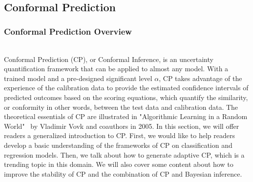 \subsection{Conformal Prediction}
\subsubsection{Conformal Prediction Overview}\hfill\\
Conformal Prediction (CP), or Conformal Inference,  is an uncertainty quantification framework that can be applied to almost any model.  With a trained model and a pre-designed significant level $\alpha$, CP takes advantage of the experience of the calibration data to provide the estimated confidence intervals of predicted outcomes based on the scoring equations, which quantify the similarity, or conformity in other words, between the test data and calibration data. The theoretical essentials of CP are illustrated in "Algorithmic Learning in a Random World"~\cite{vovk2005algorithmic} by Vladimir Vovk and coauthors in 2005. In this section, we will offer readers a generalized introduction to CP. First, we would like to help readers develop a basic understanding of the frameworks of CP on classification and regression models. Then, we talk about how to generate adaptive CP, which is a trending topic in this domain. We will also cover some content about how to improve the stability of CP and the combination of CP and Bayesian inference.

